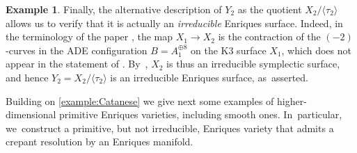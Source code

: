 \documentclass[JEP,XML,SOM,Unicode,published]{cedram}
\theoremstyle{plain}
\theoremstyle{definition}
\newtheorem{exa}[thm]{Example}
\begin{document}
\begin{exa}
Finally, the alternative description of $Y_2$ as the quotient $X_2 / \langle \tau_2 \rangle$ allows us to verify that it is actually an \emph{irreducible} Enriques surface. Indeed, in the terminology of the paper \cite{GPP24}, the map $X_1 \to X_2$ is the contraction of the $(-2)$-curves in the ADE configuration $B = A_1^{\oplus 8}$ on the K3 surface $X_1$, which does not appear in the statement of \cite[Th.\,3.6]{GPP24}. By~\cite[Th.\,3.7]{GPP24}, $X_2$ is thus an irreducible symplectic surface, and hence $Y_2 = X_2 / \langle \tau_2 \rangle$ is an irreducible Enriques surface, as~asserted.
\end{exa}

Building on \autoref{example:Catanese} we give next some examples of higher-dimensional primitive Enriques varieties, including smooth ones. In~particular, we~construct a primitive, but not irreducible, Enriques variety that admits a crepant resolution by an Enriques manifold.
\end{document}
